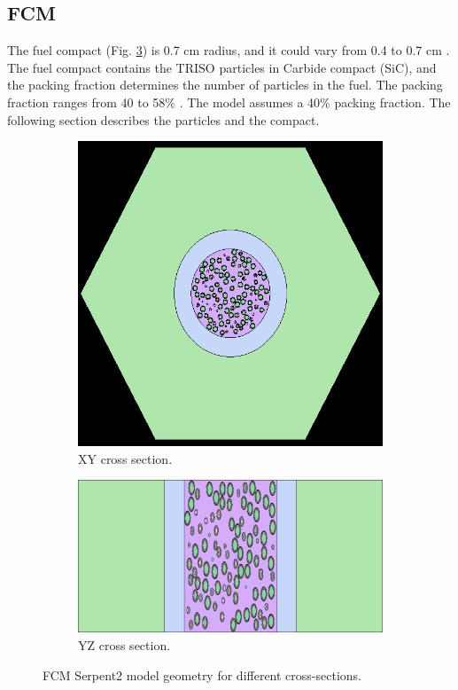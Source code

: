 \documentclass[11pt,letterpaper]{article}
\begin{document}
\subsection{FCM}

The fuel compact (Fig. \ref{fig:FCM}) is 0.7 cm radius, and it could vary from 0.4 to 0.7 cm \cite{powers_fully_2013}. The fuel compact contains the TRISO particles in Carbide compact (SiC), and the packing fraction determines the number of particles in the fuel. The packing fraction ranges from 40 to 58\% \cite{powers_fully_2013}. The model assumes a 40\% packing fraction. The following section describes the particles and the compact.

\begin{figure}[H]
	\centering
	\begin{subfigure}[t]{0.4\textwidth}
		\centering
		\includegraphics[width=\linewidth]{figures/FCM_geom1.png} 
		\caption{XY cross section.}
		\label{fig:FCM_xy}
	\end{subfigure}
	\begin{subfigure}[t]{0.4\textwidth}
		\centering
		\includegraphics[width=\linewidth]{figures/FCM_geom2.png}
		\caption{YZ cross section.}
		\label{fig:FCM_yz}
	\end{subfigure}
	\hfill
	\caption{FCM Serpent2 model geometry for different cross-sections.}
	\label{fig:FCM}
\end{figure}
\end{document}
